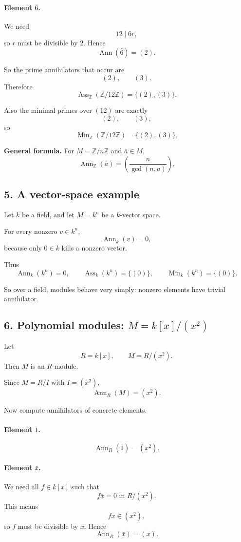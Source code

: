 \documentclass[12pt,a4paper,oneside]{report}
\DeclareMathOperator{\Ass}{Ass}
\DeclareMathOperator{\Ann}{Ann}
\DeclareMathOperator{\Min}{Min}
\theoremstyle{notespace}
\begin{document}
	\paragraph{Element \(\bar 6\).}
	We need
	\[
	12\mid 6r,
	\]
	so \(r\) must be divisible by \(2\). Hence
	\[
	\Ann(\bar 6)=(2).
	\]
	
	So the prime annihilators that occur are
	\[
	(2),\qquad (3).
	\]
	Therefore
	\[
	\Ass_{\mathbb Z}(\mathbb Z/12\mathbb Z)=\{(2),(3)\}.
	\]
	
	Also the minimal primes over \((12)\) are exactly
	\[
	(2),\qquad (3),
	\]
	so
	\[
	\Min_{\mathbb Z}(\mathbb Z/12\mathbb Z)=\{(2),(3)\}.
	\]
	
	\medskip
	
	\noindent
	\textbf{General formula.}
	For \(M=\mathbb Z/n\mathbb Z\) and \(\bar a\in M\),
	\[
	\Ann_{\mathbb Z}(\bar a)=\left(\frac{n}{\gcd(n,a)}\right).
	\]
	
	\subsection{5. A vector-space example}
	
	Let \(k\) be a field, and let \(M=k^n\) be a \(k\)-vector space.
	
	For every nonzero \(v\in k^n\),
	\[
	\Ann_k(v)=0,
	\]
	because only \(0\in k\) kills a nonzero vector.
	
	Thus
	\[
	\Ann_k(k^n)=0,
	\qquad
	\Ass_k(k^n)=\{(0)\},
	\qquad
	\Min_k(k^n)=\{(0)\}.
	\]
	
	So over a field, modules behave very simply: nonzero elements have trivial annihilator.
	
	\subsection{6. Polynomial modules: \(M=k[x]/(x^2)\)}
	
	Let
	\[
	R=k[x],\qquad M=R/(x^2).
	\]
	Then \(M\) is an \(R\)-module.
	
	Since \(M=R/I\) with \(I=(x^2)\),
	\[
	\Ann_R(M)=(x^2).
	\]
	
	Now compute annihilators of concrete elements.
	
	\paragraph{Element \(\bar 1\).}
	\[
	\Ann_R(\bar 1)=(x^2).
	\]
	
	\paragraph{Element \(\bar x\).}
	We need all \(f\in k[x]\) such that
	\[
	f\bar x=0 \text{ in } R/(x^2).
	\]
	This means
	\[
	fx\in (x^2),
	\]
	so \(f\) must be divisible by \(x\). Hence
	\[
	\Ann_R(\bar x)=(x).
	\]
	
\end{document}
